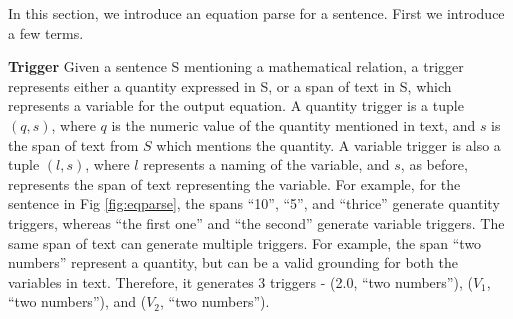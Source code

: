\begin{figure*}
\begin{center}
\end{center}
\caption{Example of an Equation parse}
\label{fig:eqparse}
\end{figure*}

  In this section, we introduce an equation parse for a
  sentence. First we introduce a few terms.

  \noindent \textbf{Trigger} Given a sentence S mentioning a
  mathematical relation, a trigger represents either a quantity
  expressed in S, or a span of text in S, which represents a variable
  for the output equation. A quantity trigger is a tuple $(q, s)$,
  where $q$ is the numeric value of the quantity mentioned in text,
  and $s$ is the span of text from $S$ which mentions the quantity. A
  variable trigger is also a tuple $(l, s)$, where $l$ represents a
  naming of the variable, and $s$, as before, represents the span of
  text representing the variable. For example, for the sentence in Fig
  \ref{fig:eqparse}, the spans ``10'', ``5'', and ``thrice'' generate
  quantity triggers, whereas ``the first one'' and ``the second''
  generate variable triggers. The same span of text can generate
  multiple triggers.  For example, the span ``two numbers'' represent
  a quantity, but can be a valid grounding for both the variables in
  text. Therefore, it generates $3$ triggers - (2.0, ``two numbers''), 
  ($V_1$, ``two numbers''), and ($V_2$, ``two numbers'').

